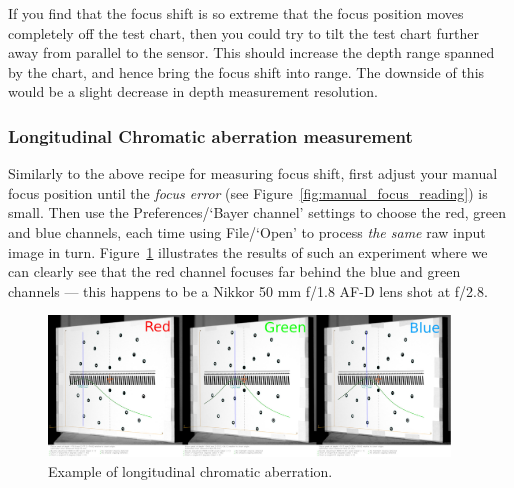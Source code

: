 \documentclass[a4paper]{article}
\begin{document}
If you find that the focus shift is so extreme that the focus position moves
completely off the test chart, then you could try to tilt the test chart
further away from parallel to the sensor. This should increase the depth
range spanned by the chart, and hence bring the focus shift into range. The
downside of this would be a slight decrease in depth measurement resolution.

\subsubsection{Longitudinal Chromatic aberration measurement}
Similarly to the above recipe for measuring focus shift, first adjust your manual
focus position until the \emph{focus error} (see Figure~\ref{fig:manual_focus_reading})
is small. Then use the \textsf{Preferences}/`Bayer
channel' settings to choose the red, green and blue channels, each time
using \textsf{File}/`Open' to process \emph{the same} raw input
image in turn. Figure~\ref{fig:loca_example_rep} illustrates the results of
such an experiment where we can clearly see that the red channel focuses
far behind the blue and green channels --- this happens to be a Nikkor 50 mm
f/1.8 AF-D lens shot at f/2.8.

\begin{figure}[!ht]
\centering
\includegraphics[width=0.95\textwidth]{figures/loca_example}
\caption{Example of longitudinal chromatic aberration.}
\label{fig:loca_example_rep}
\end{figure}

\newpage 
\end{document}
